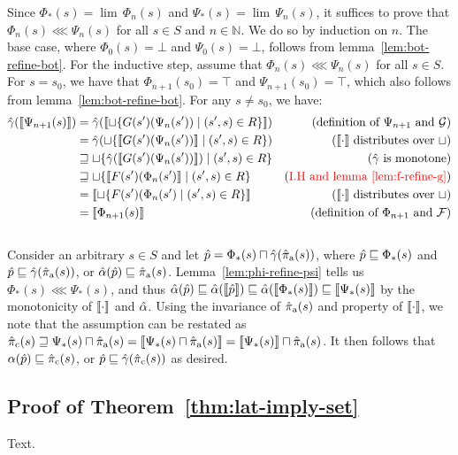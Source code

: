 Since $\Phi_{*}(s) = \lim \, \Phi_{n}(s)$ and $\Psi_{*}(s) = \lim \, \Psi_{n}(s)$, it suffices to prove that $\Phi_{n}(s) \lll \Psi_{n}(s)$ for all $s \in S$ and $n \in \mathbb{N}$. We do so by induction on $n$. The base case, where $\Phi_{0}(s) = \bot$ and $\Psi_{0}(s) = \bot$, follows from lemma~\ref{lem:bot-refine-bot}. For the inductive step, assume that $\Phi_{n}(s) \lll \Psi_{n}(s)$ for all $s \in S$. For $s = s_{0}$, we have that $\Phi_{n+1}(s_{0}) = \top$ and $\Psi_{n+1}(s_{0}) = \top$, which also follows from lemma~\ref{lem:bot-refine-bot}. For any $s \neq s_{0}$, we have:
%
\begin{align*}
\hat{\gamma}(\llbracket \Psi_{n+1}(s) \rrbracket)
  & =         \hat{\gamma}(\llbracket \sqcup \{ G(s')(\Psi_{n}(s')) \mid (s',s) \in R \} \rrbracket) & (\textrm{definition of } \Psi_{n+1} \textrm { and } \mathcal{G}) \\
  & =         \hat{\gamma}(\sqcup \{ \llbracket G(s')(\Psi_{n}(s')) \rrbracket \mid (s',s) \in R \}) & (\llbracket \cdot \rrbracket \textrm{ distributes over } \sqcup) \\
  & \sqsupseteq \sqcup \{ \hat{\gamma}(\llbracket G(s')(\Psi_{n}(s')) \rrbracket) \mid (s',s) \in R \} & (\hat{\gamma} \textrm{ is monotone}) \\
  & \sqsupseteq \sqcup \{ \llbracket F(s')(\Phi_{n}(s') \rrbracket \mid (s',s) \in R \}           & (\textrm{\textcolor{red}{I.H and lemma~\ref{lem:f-refine-g}}}) \\
  & =         \llbracket \sqcup \{ F(s')(\Phi_{n}(s') \mid (s',s) \in R \} \rrbracket           & (\llbracket \cdot \rrbracket \textrm{ distributes over } \sqcup) \\
  & =         \llbracket \Phi_{n+1}(s) \rrbracket                                              & (\textrm{definition of } \Phi_{n+1} \textrm{ and } \mathcal{F})
\end{align*}
\\

Consider an arbitrary $s \in S$ and let $\hat p = \Phi_{*}(s) \sqcap \hat{\gamma}(\operatorname{\hat{\pi}_{\textrm{a}}}(s))$, where $\hat p \sqsubseteq \Phi_{*}(s)$ and $\hat p \sqsubseteq \hat{\gamma}(\operatorname{\hat{\pi}_{\textrm{a}}}(s))$, or $\hat{\alpha}(\hat p) \sqsubseteq \operatorname{\hat{\pi}_{\textrm{a}}}(s)$. Lemma~\ref{lem:phi-refine-psi} tells us $\Phi_{*}(s) \lll \Psi_{*}(s)$, and thus $\hat{\alpha}(\hat p) \sqsubseteq \hat{\alpha}(\llbracket \hat p \rrbracket) \sqsubseteq \hat{\alpha}(\llbracket \Phi_{*}(s) \rrbracket) \sqsubseteq \llbracket \Psi_{*}(s) \rrbracket$ by the monotonicity of $\llbracket \cdot \rrbracket$ and $\hat{\alpha}$. Using the invariance of $\operatorname{\hat{\pi}_{\textrm{a}}}(s)$ and property  of $\llbracket \cdot \rrbracket$, we note that the assumption can be restated as $\operatorname{\hat{\pi}_{\textrm{c}}}(s) \sqsupseteq \Psi_{*}(s) \sqcap \operatorname{\hat{\pi}_{\textrm{a}}}(s) = \llbracket \Psi_{*}(s) \sqcap \operatorname{\hat{\pi}_{\textrm{a}}}(s) \rrbracket = \llbracket \Psi_{*}(s) \rrbracket \sqcap \operatorname{\hat{\pi}_{\textrm{a}}}(s)$. It then follows that $\alpha(\hat p) \sqsubseteq \operatorname{\hat{\pi}_{\textrm{c}}}(s)$, or $\hat p \sqsubseteq \hat{\gamma}(\operatorname{\hat{\pi}_{\textrm{c}}}(s))$ as desired. %

\subsection{Proof of Theorem~\ref{thm:lat-imply-set}}

Text.
